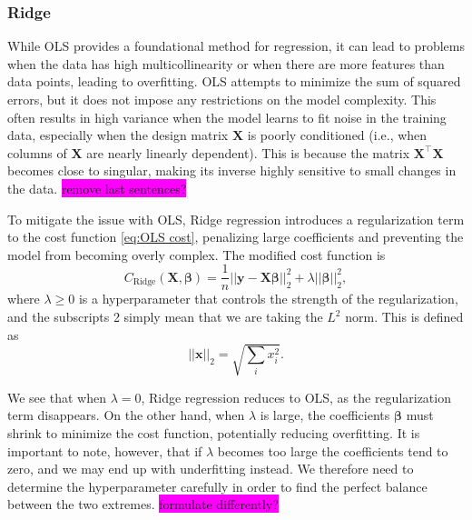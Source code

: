 \documentclass[aps,pra,english,notitlepage,reprint,nofootinbib]{revtex4-1}  %
\begin{document}
\subsubsection{Ridge}\label{subsubsec:ridge} 
While OLS provides a foundational method for regression, it can lead to problems when the data has high multicollinearity or when there are more features than data points, leading to overfitting. OLS attempts to minimize the sum of squared errors, but it does not impose any restrictions on the model complexity. This often results in high variance when the model learns to fit noise in the training data, especially when the design matrix $\mathbf{X}$ is poorly conditioned (i.e., when columns of $\mathbf{X}$ are nearly linearly dependent). This is because the matrix $\mathbf{X}^\top \mathbf{X}$ becomes close to singular, making its inverse highly sensitive to small changes in the data. \colorbox{magenta}{remove last sentences?}

To mitigate the issue with OLS, Ridge regression introduces a regularization term to the cost function \eqref{eq:OLS cost}, penalizing large coefficients and preventing the model from becoming overly complex. The modified cost function is
\begin{equation}
  C_{\text{Ridge}}(\mathbf{X},\boldsymbol{\beta}) = \frac{1}{n}\left|\left|\mathbf{y}-\mathbf{X}\boldsymbol{\beta} \right|\right|_2^2 + \lambda \left|\left|\boldsymbol{\beta}\right|\right|_2^2,
\end{equation}
where $\lambda \geq 0$ is a hyperparameter that controls the strength of the regularization, and the subscripts 2 simply mean that we are taking the $L^2$ norm. This is defined as
\begin{equation*}
  \left|\left|\mathbf{x}\right|\right|_2 = \sqrt{\sum_ix_i^2}.
\end{equation*}

We see that when $\lambda = 0$, Ridge regression reduces to OLS, as the regularization term disappears. On the other hand, when $\lambda$ is large, the coefficients $\boldsymbol{\beta}$ must shrink to minimize the cost function, potentially reducing overfitting. It is important to note, however, that if $\lambda$ becomes too large the coefficients tend to zero, and we may end up with underfitting instead. We therefore need to determine the hyperparameter carefully in order to find the perfect balance between the two extremes. \colorbox{magenta}{formulate differently?}
\end{document}
